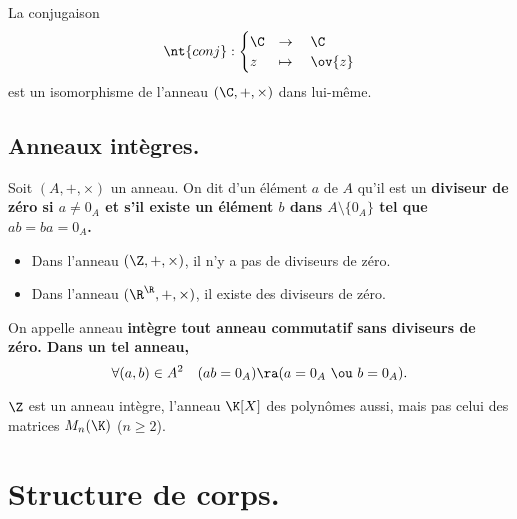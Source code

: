 \documentclass[11pt]{article}
\begin{document}
\begin{ex}{}{}
    La conjugaison
    \begin{equation*}
        \nt{conj}:\begin{cases}
            \C &\to \quad \C\\
            z &\mapsto \quad \ov{z}
        \end{cases}
    \end{equation*}
    est un isomorphisme de l'anneau $(\C,+,\times)$ dans lui-même.
\end{ex}

\subsection{Anneaux intègres.}

\begin{defi}{}{}
    Soit $(A,+,\times)$ un anneau. On dit d'un élément $a$ de $A$ qu'il est un \bf{diviseur de zéro} si $a\neq 0_A$ et s'il existe un élément $b$ dans $A\setminus\{0_A\}$ tel que $ab=ba=0_A$.
\end{defi}

\begin{ex}{}{}
    \begin{itemize}
        \item Dans l'anneau $(\Z,+,\times)$, il n'y a pas de diviseurs de zéro.
        \item Dans l'anneau $(\R^\R,+,\times)$, il existe des diviseurs de zéro.
    \end{itemize}
\end{ex}

\begin{defi}{}{}
    On appelle anneau \bf{intègre} tout anneau commutatif sans diviseurs de zéro. Dans un tel anneau,
    \begin{equation*}
        \forall (a,b)\in A^2 \quad (ab=0_A) \ra (a = 0_A ~\ou~ b=0_A).
    \end{equation*}
\end{defi}

\begin{ex}{}{}
    $\Z$ est un anneau intègre, l'anneau $\K[X]$ des polynômes aussi, mais pas celui des matrices $M_n(\K)$ ($n\geq2$).
\end{ex}

\section{Structure de corps.}
\end{document}
